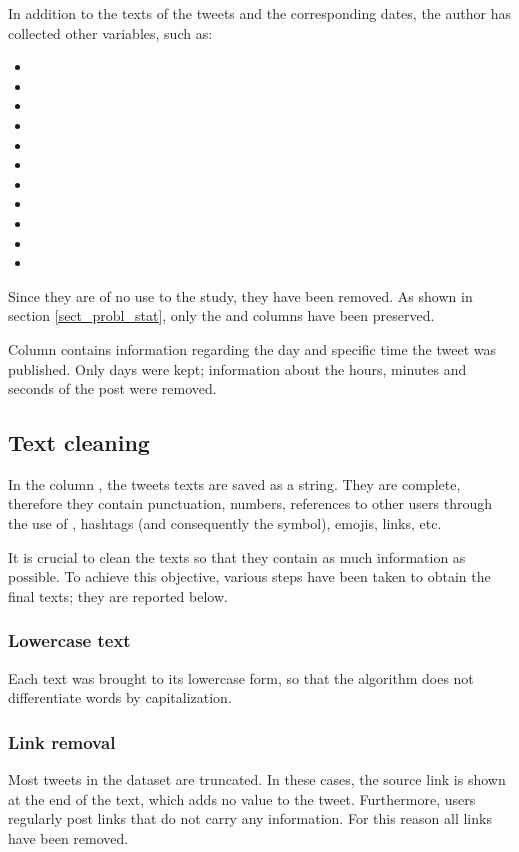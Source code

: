In addition to the texts of the tweets and the corresponding dates, the author has collected other variables, such as: 
\begin{itemize}
  \item {}
  \item {}
  \item {}
  \item {}
  \item {}
  \item {}
  \item {}
  \item {}
  \item {}
  \item {}
  \item {}
\end{itemize}

Since they are of no use to the study, they have been removed. As shown in section \ref{sect_probl_stat}, only the  and  columns have been preserved.

Column  contains information regarding the day and specific time the tweet was published. Only days were kept; information about the hours, minutes and seconds of the post were removed.

\subsection*{Text cleaning}

In the column , the tweets texts are saved as a string. They are complete, therefore they contain punctuation, numbers, references to other users through the use of , hashtags (and consequently the \code{\#} symbol), emojis, links, etc.

It is crucial to clean the texts so that they contain as much information as possible. To achieve this objective, various steps have been taken to obtain the final texts; they are reported below.

\subsubsection*{Lowercase text}
Each text was brought to its lowercase form, so that the algorithm does not differentiate words by capitalization.

\subsubsection*{Link removal}
Most tweets in the dataset are truncated. In these cases, the source link is shown at the end of the text, which adds no value to the tweet. Furthermore, users regularly post links that do not carry any information. For this reason all links have been removed.

